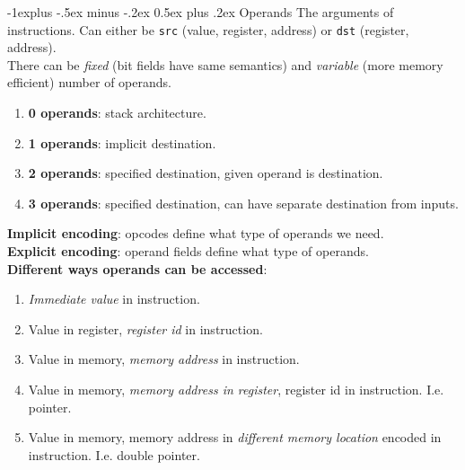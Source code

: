 \documentclass[10pt,landscape]{article}
\makeatletter
\renewcommand{\subsection}{\@startsection{subsection}{2}{0mm}%
                                {-1explus -.5ex minus -.2ex}%
                                {0.5ex plus .2ex}%
                                {\normalfont\normalsize\bfseries}}
\makeatother
\begin{document}
\begin{multicols}{3}
\subsection{Operands}
The arguments of instructions. Can either be \texttt{src} (value, register, address) or \texttt{dst} (register, address).\\
There can be \textit{fixed} (bit fields have same semantics) and \textit{variable} (more memory efficient) number of operands. \\
\begin{enumerate}
\item \textbf{0 operands}: stack architecture.
\item \textbf{1 operands}: implicit destination.
\item \textbf{2 operands}: specified destination, given operand is destination.
\item \textbf{3 operands}: specified destination, can have separate destination from inputs.
\end{enumerate}
\textbf{Implicit encoding}: opcodes define what type of operands we need.\\
\textbf{Explicit encoding}: operand fields define what type of operands.\\
\textbf{Different ways operands can be accessed}:
\begin{enumerate}
\item \textit{Immediate value} in instruction.
\item Value in register, \textit{register id} in instruction.
\item Value in memory, \textit{memory address} in instruction.
\item Value in memory, \textit{memory address in register}, register id in instruction. I.e. pointer.
\item Value in memory, memory address in \textit{different memory location} encoded in instruction. I.e. double pointer.
\end{enumerate}
\end{multicols}
\end{document}
